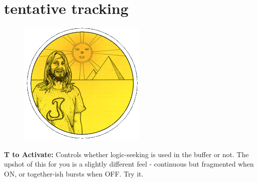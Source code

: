\clearpage

\section*{tentative tracking} 
\label{sec:tracking}
\lstset{style=6502Style}
\lstset{ 
   aboveskip=5pt,
   belowskip=0pt,
}

\begin{definition}
\setlength{\intextsep}{0pt}%
\setlength{\columnsep}{3pt}%
\begin{figure}
\includegraphics[width=\linewidth]{src/callout/psych.png} 
\end{figure}
\small
\textbf{T to Activate:} Controls whether logic-seeking is used in
the buffer or not. The upshot of this for you is a slightly different
feel - continuous but fragmented when ON, or together-ish bursts
when OFF. Try it.
\end{definition}


